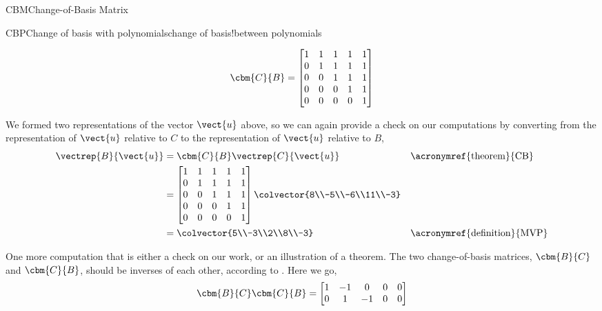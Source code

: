 \begin{subsect}{CBM}{Change-of-Basis Matrix}
\begin{example}{CBP}{Change of basis with polynomials}{change of basis!between polynomials}
\begin{para}
%
\begin{equation*}
\cbm{C}{B}=
\begin{bmatrix}
1 & 1 & 1 & 1 & 1\\
0 & 1 & 1 & 1 & 1\\
0 & 0 & 1 & 1 & 1\\
0 & 0 & 0 & 1 & 1\\
0 & 0 & 0 & 0 & 1\\
\end{bmatrix}
\end{equation*}
\end{para}
%
\begin{para}We formed two representations of the vector $\vect{u}$ above, so we can again provide a check on our computations by converting from the representation of $\vect{u}$ relative to $C$ to the representation of $\vect{u}$ relative to $B$,
%
\begin{align*}
\vectrep{B}{\vect{u}}
&=\cbm{C}{B}\vectrep{C}{\vect{u}}&&\text{\acronymref{theorem}{CB}}\\
%
&=
\begin{bmatrix}
1 & 1 & 1 & 1 & 1\\
0 & 1 & 1 & 1 & 1\\
0 & 0 & 1 & 1 & 1\\
0 & 0 & 0 & 1 & 1\\
0 & 0 & 0 & 0 & 1\\
\end{bmatrix}
\colvector{8\\-5\\-6\\11\\-3}\\
%
&=\colvector{5\\-3\\2\\8\\-3}&&\text{\acronymref{definition}{MVP}}\\
%
\end{align*}
\end{para}
%
\begin{para}One more computation that is either a check on our work, or an illustration of a theorem.  The two change-of-basis matrices, $\cbm{B}{C}$ and $\cbm{C}{B}$, should be inverses of each other, according to .  Here we go,
%
\begin{equation*}
\cbm{B}{C}\cbm{C}{B}=
\begin{bmatrix}
1 &-1 & 0 & 0 & 0\\
0 & 1 &-1 & 0 & 0\\

\end{bmatrix}
\end{equation*}
\end{para}
\end{example}
\end{subsect}
